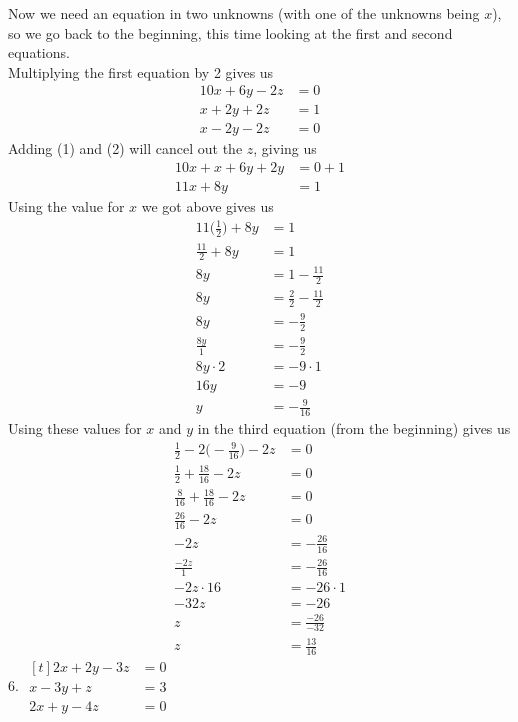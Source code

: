 \documentclass[12pt]{article}
\begin{document}
Now we need an equation in two unknowns (with one of the unknowns being $x$), so we go back to the beginning, this time looking at the first and second equations. \\
Multiplying the first equation by 2 gives us
\begin{align}
10x+6y-2z&=0 \\
x+2y+2z&=1 \\
x-2y-2z&=0
\end{align}
Adding (1) and (2) will cancel out the $z$, giving us
\begin{align*}
10x+x+6y+2y&=0+1 \\
11x+8y&=1
\end{align*}
Using the value for $x$ we got above gives us
\begin{align*}
11\bigg(\displaystyle \frac{1}{2}\bigg)+8y&=1 \\
\displaystyle \frac{11}{2}+8y&=1 \\
8y&=1-\displaystyle \frac{11}{2} \\
8y&=\displaystyle \frac{2}{2}-\displaystyle \frac{11}{2} \\
8y&=-\displaystyle \frac{9}{2} \\
\displaystyle \frac{8y}{1}&=-\displaystyle \frac{9}{2} \\
8y\cdot2&=-9\cdot1 \\
16y&=-9 \\
y&=-\displaystyle \frac{9}{16}
\end{align*}
Using these values for $x$ and $y$ in the third equation (from the beginning) gives us
\begin{align*}
\displaystyle \frac{1}{2}-2\bigg(-\displaystyle \frac{9}{16}\bigg)-2z&=0 \\
\displaystyle \frac{1}{2}+\displaystyle \frac{18}{16}-2z&=0 \\
\displaystyle \frac{8}{16}+\displaystyle \frac{18}{16}-2z&=0 \\
\displaystyle \frac{26}{16}-2z&=0 \\
-2z&=-\displaystyle \frac{26}{16} \\
\displaystyle \frac{-2z}{1}&=-\displaystyle \frac{26}{16} \\
-2z\cdot16&=-26\cdot1 \\
-32z&=-26 \\
z&=\displaystyle \frac{-26}{-32} \\
z&=\displaystyle \frac{13}{16}
\end{align*}
\setcounter{equation}{0}
6. $\begin{aligned}[t]
2x+2y-3z&=0 \\
x-3y+z&=3 \\
2x+y-4z&=0
\end{aligned}$ \\
\end{document}
